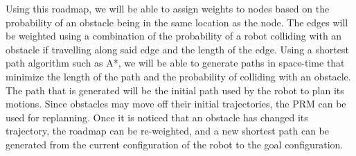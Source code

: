 \documentclass{article}
\begin{document}
Using this roadmap, we will be able to assign weights to nodes based on the
probability of an obstacle being in the same location as the node. The edges
will be weighted using a combination of the probability of a robot colliding
with an obstacle if travelling along said edge and the length of the edge.
Using a shortest path algorithm such as A*, we will be able to generate paths
in space-time that minimize the length of the path and the probability of
colliding with an obstacle. The path that is generated will be the initial path
used by the robot to plan its motions. Since obstacles may move off their
initial trajectories, the PRM can be used for replanning. Once it is noticed
that an obstacle has changed its trajectory, the roadmap can be re-weighted,
and a new shortest path can be generated from the current configuration of the
robot to the goal configuration.

%  
\end{document}
